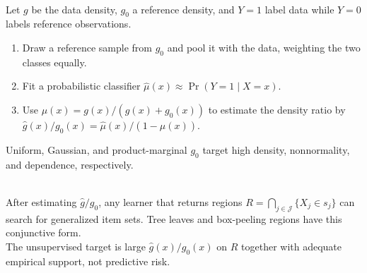 \begin{method} \label{meth:sl-unsupervised-as-supervised-density-ratio} \\
Let $g$ be the data density, $g_0$ a reference density, and $Y=1$ label data while $Y=0$ labels reference observations.
\begin{enumerate}[label=(\roman*)]
\setlength{\itemsep}{0pt}
\item Draw a reference sample from $g_0$ and pool it with the data, weighting the two classes equally.
\item Fit a probabilistic classifier $\widehat{\mu}(x)\approx\Pr(Y=1\mid X=x)$.
\item Use $\mu(x)=g(x)/(g(x)+g_0(x))$ to estimate the density ratio by $\widehat{g}(x)/g_0(x)=\widehat{\mu}(x)/(1-\widehat{\mu}(x))$.
\end{enumerate}
Uniform, Gaussian, and product-marginal $g_0$ target high density, nonnormality, and dependence, respectively.
\end{method}

\begin{remark} \label{rem:sl-rule-learners-for-density-ratios} \\
After estimating $\widehat{g}/g_0$, any learner that returns regions $R=\bigcap\limits_{j\in\mathcal{J}}\{X_j\in s_j\}$ can search for generalized item sets. Tree leaves and box-peeling regions have this conjunctive form.\\
The unsupervised target is large $\widehat{g}(x)/g_0(x)$ on $R$ together with adequate empirical support, not predictive risk.
\end{remark}
